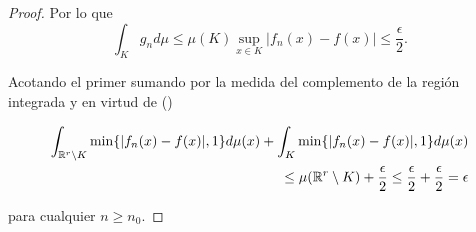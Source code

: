 \begin{proof}
    Por lo que  
    \begin{equation} \label{eq:lema3_2_integral_en_compacto_K}
        \int_K g_n d\mu 
        \leq
         \mu(K) \sup_{x \in K} |f_n(x) - f(x)| 
        \leq 
        \frac{\epsilon}{2} .
    \end{equation}

    Acotando el primer sumando por la medida 
    del complemento de la región integrada y en virtud de 
    ()

    \begin{equation}
        \begin{split}
            \int_{\mathbb{R}^r \setminus K} \min \{ |f_n(x) - f(x)|, 1\} d\mu(x) 
            +
            \int_{K} \min \{ |f_n(x) - f(x)|, 1\} d\mu(x)  \\ \leq
            \mu(\mathbb{R}^r \setminus K) +  \frac{\epsilon}{2}
            \leq
            \frac{\epsilon}{2} +  \frac{\epsilon}{2}
            = 
            \epsilon
        \end{split}
    \end{equation}

    para cualquier $n \geq n_0$. 
\end{proof}



